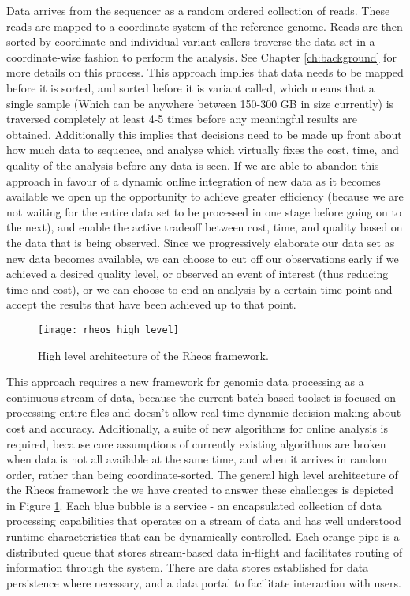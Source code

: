 Data arrives from the sequencer as a random ordered collection of reads. These reads are mapped to a coordinate system of the reference genome. Reads are then sorted by coordinate and individual variant callers traverse the data set in a coordinate-wise fashion to perform the analysis. See Chapter \ref{ch:background} for more details on this process. This approach implies that data needs to be mapped before it is sorted, and sorted before it is variant called, which means that a single sample (Which can be anywhere between 150-300 GB in size currently) is traversed completely at least 4-5 times before any meaningful results are obtained. Additionally this implies that decisions need to be made up front about how much data to sequence, and analyse which virtually fixes the cost, time, and quality of the analysis before any data is seen. If we are able to abandon this approach in favour of a dynamic online integration of new data as it becomes available we open up the opportunity to achieve greater efficiency (because we are not waiting for the entire data set to be processed in one stage before going on to the next), and enable the active tradeoff between cost, time, and quality based on the data that is being observed. Since we progressively elaborate our data set as new data becomes available, we can choose to cut off our observations early if we achieved a desired quality level, or observed an event of interest (thus reducing time and cost), or we can choose to end an analysis by a certain time point and accept the results that have been achieved up to that point. 

\begin{figure}[H]
\texttt{[image: rheos\_high\_level]}
\centering
\caption {High level architecture of the Rheos framework.}
\label{fig:rheos_high_level}
\end{figure}

This approach requires a new framework for genomic data processing as a continuous stream of data, because the current batch-based toolset is focused on processing entire files and doesn't allow real-time dynamic decision making about cost and accuracy. Additionally, a suite of new algorithms for online analysis is required, because core assumptions of currently existing algorithms are broken when data is not all available at the same time, and when it arrives in random order, rather than being coordinate-sorted. The general high level architecture of the Rheos framework the we have created to answer these challenges is depicted in Figure \ref{fig:rheos_high_level}. Each blue bubble is a service - an encapsulated collection of data processing capabilities that operates on a stream of data and has well understood runtime characteristics that can be dynamically controlled. Each orange pipe is a distributed queue that stores stream-based data in-flight and facilitates routing of information through the system. There are data stores established for data persistence where necessary, and a data portal to facilitate interaction with users.

